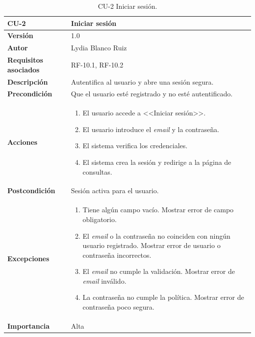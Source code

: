 \begin{table}[p]
	\centering
	\begin{tabularx}{\linewidth}{ p{} p{} }
		\toprule
		\textbf{CU-2}    & \textbf{Iniciar sesión}\\
		\toprule
		\textbf{Versión}              & 1.0    \\
		\textbf{Autor}                & Lydia Blanco Ruiz \\
		\textbf{Requisitos asociados} & RF-10.1, RF-10.2 \\
		\textbf{Descripción}          & Autentifica al usuario y abre una sesión segura. \\
		\textbf{Precondición}         & Que el usuario esté registrado y no esté autentificado. \\
		\textbf{Acciones}             &
		\begin{enumerate}
			\def\labelenumi{\arabic{enumi}.}
			\tightlist
			\item El usuario accede a <<Iniciar sesión>>.
			\item El usuario introduce el \textit{email} y la contraseña.
			\item El sistema verifica los credenciales.
			\item El sistema crea la sesión y redirige a la página de consultas.
		\end{enumerate}\\
		\textbf{Postcondición}        & Sesión activa para el usuario. \\
		\textbf{Excepciones}          & 
		\begin{enumerate}
			\def\labelenumi{\arabic{enumi}.}
			\tightlist
			\item Tiene algún campo vacío.  Mostrar error de campo obligatorio.
			\item El \textit{email} o la contraseña no coinciden con ningún usuario registrado. Mostrar error de usuario o contraseña incorrectos.
			\item El \textit{email} no cumple la validación. Mostrar error de \textit{email} inválido.
			\item La contraseña no cumple la política. Mostrar error de contraseña poco segura.		
		\end{enumerate}\\
		\textbf{Importancia}          & Alta  \\
		\bottomrule
	\end{tabularx}
	\caption{CU-2 Iniciar sesión.}
\end{table}

